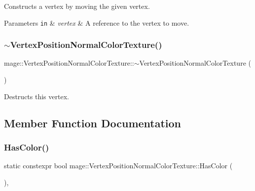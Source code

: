 Constructs a vertex by moving the given vertex.


\begin{DoxyParams}[1]{Parameters}
\mbox{\tt in}  & {\em vertex} & A reference to the vertex to move. \\
\hline
\end{DoxyParams}
\hypertarget{structmage_1_1_vertex_position_normal_color_texture_af3538a12eab74715dd9b5256f8765162}{}\label{structmage_1_1_vertex_position_normal_color_texture_af3538a12eab74715dd9b5256f8765162} 
\subsubsection{\texorpdfstring{$\sim$\+Vertex\+Position\+Normal\+Color\+Texture()}{~VertexPositionNormalColorTexture()}}
{\footnotesize\ttfamily mage\+::\+Vertex\+Position\+Normal\+Color\+Texture\+::$\sim$\+Vertex\+Position\+Normal\+Color\+Texture (\begin{DoxyParamCaption}{ }\end{DoxyParamCaption})\hspace{0.3cm}{\ttfamily [default]}}

Destructs this vertex. 

\subsection{Member Function Documentation}
\hypertarget{structmage_1_1_vertex_position_normal_color_texture_aee56f3577ac93b0f57084ab76ec45abd}{}\label{structmage_1_1_vertex_position_normal_color_texture_aee56f3577ac93b0f57084ab76ec45abd} 
\subsubsection{\texorpdfstring{Has\+Color()}{HasColor()}}
{\footnotesize\ttfamily static constexpr bool mage\+::\+Vertex\+Position\+Normal\+Color\+Texture\+::\+Has\+Color (\begin{DoxyParamCaption}{ }\end{DoxyParamCaption})\hspace{0.3cm}{\ttfamily [static]}, {\ttfamily [noexcept]}}

